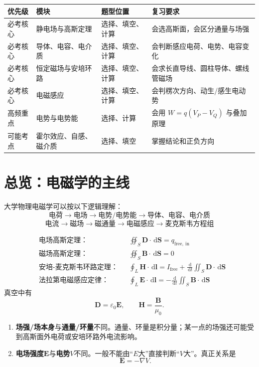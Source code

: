 \documentclass[UTF8,zihao=-4]{ctexart}
\newcommand{\dd}{\,\mathrm d}
\newcommand{\epsz}{\varepsilon_0}
\newcommand{\muz}{\mu_0}
\newcommand{\ve}[1]{\bm{#1}}
\newcommand{\E}{\ve E}
\newcommand{\B}{\ve B}
\newcommand{\D}{\ve D}
\newcommand{\Hf}{\ve H}
\newcommand{\dl}{\dd\ve l}
\newcommand{\dS}{\dd\ve S}
\newcommand{\grad}{\nabla}
\begin{document}
\begin{longtable}{p{}p{}p{}p{}}
\toprule
\textbf{优先级} & \textbf{模块} & \textbf{题型位置} & \textbf{复习要求} \\
\midrule
必考核心 & 静电场与高斯定理 & 选择、填空、计算 & 会选高斯面，会区分通量与场强 \\
必考核心 & 导体、电容、电介质 & 选择、填空、计算 & 会判断感应电荷、电势、电容变化 \\
必考核心 & 恒定磁场与安培环路 & 选择、填空、计算 & 会求长直导线、圆柱导体、螺线管磁场 \\
必考核心 & 电磁感应 & 选择、填空、计算 & 会判楞次方向、动生/感生电动势 \\
高频重点 & 电势与电势能 & 选择、计算 & 会用 $W=q(V_P-V_Q)$ 与叠加原理 \\
可能考点 & 霍尔效应、自感、磁介质 & 选择、填空 & 掌握结论和正负方向 \\
\bottomrule
\end{longtable}

\section{总览：电磁学的主线}

大学物理电磁学可以按以下逻辑理解：
\[
\text{电荷} \to \text{电场} \to \text{电势/电势能} \to \text{导体、电容、电介质}
\]
\[
\text{电流} \to \text{磁场} \to \text{磁通量} \to \text{电磁感应} \to \text{麦克斯韦方程组}
\]

\begin{keybox}[四条最终主线]
\begin{align*}
&\text{电场高斯定理：} &&\oiint_S \D\cdot\dS=q_{\mathrm{free,\ in}} \\
&\text{磁场高斯定理：} &&\oiint_S \B\cdot\dS=0 \\
&\text{安培-麦克斯韦环路定理：} &&\oint_L \Hf\cdot\dl=I_{\mathrm{free}}+\frac{\dd}{\dd t}\iint_S \D\cdot\dS \\
&\text{法拉第电磁感应定律：} &&\oint_L \E\cdot\dl=-\frac{\dd}{\dd t}\iint_S \B\cdot\dS
\end{align*}
真空中有
\[
\D=\epsz \E,\qquad \Hf=\frac{\B}{\muz}.
\]
\end{keybox}

\begin{warnbox}[最容易混淆的两组概念]
\begin{enumerate}
  \item \textbf{场强/场本身}与\textbf{通量/环量}不同。通量、环量是积分量；某一点的场强还可能受到高斯面外电荷或安培环路外电流影响。
  \item \textbf{电场强度}\(\E\)与\textbf{电势}\(V\)不同。一般不能由“\(E\)大”直接判断“\(V\)大”。真正关系是
  \[
  \E=-\grad V.
  \]
\end{enumerate}
\end{warnbox}
\end{document}
